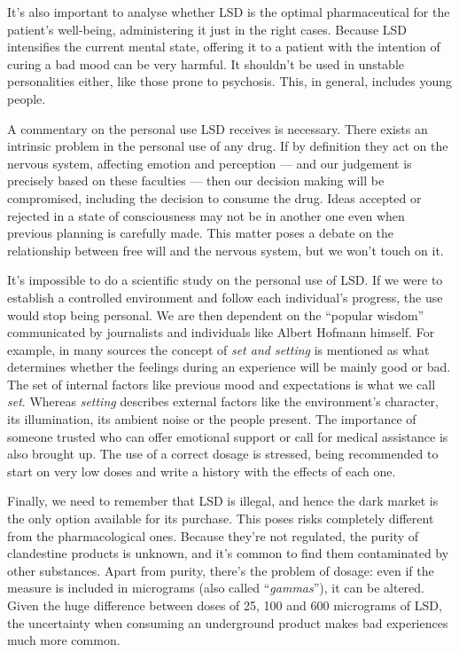 It's also important to analyse whether LSD is the optimal pharmaceutical for the patient's well-being, administering it just in the right cases. Because LSD intensifies the current mental state, offering it to a patient with the intention of curing a bad mood can be very harmful. It shouldn't be used in unstable personalities either, like those prone to psychosis. This, in general, includes young people.

A commentary on the personal use LSD receives is necessary. There exists an intrinsic problem in the personal use of any drug. If by definition they act on the nervous system, affecting emotion and perception --- and our judgement is precisely based on these faculties --- then our decision making will be compromised, including the decision to consume the drug. Ideas accepted or rejected in a state of consciousness may not be in another one even when previous planning is carefully made. This matter poses a debate on the relationship between free will and the nervous system, but we won't touch on it.

It's impossible to do a scientific study on the personal use of LSD. If we were to establish a controlled environment and follow each individual's progress, the use would stop being personal. We are then dependent on the \enquote{popular wisdom} communicated by journalists and individuals like Albert Hofmann himself. For example, in many sources the concept of \textit{set and setting} is mentioned as what determines whether the feelings during an experience will be mainly good or bad. The set of internal factors like previous mood and expectations is what we call \textit{set}. Whereas \textit{setting} describes external factors like the environment's character, its illumination, its ambient noise or the people present. The importance of someone trusted who can offer emotional support or call for medical assistance is also brought up. The use of a correct dosage is stressed, being recommended to start on very low doses and write a history with the effects of each one.

Finally, we need to remember that LSD is illegal, and hence the dark market is the only option available for its purchase. This poses risks completely different from the pharmacological ones. Because they're not regulated, the purity of clandestine products is unknown, and it's common to find them contaminated by other substances. Apart from purity, there's the problem of dosage: even if the measure is included in micrograms (also called \enquote{\textit{gammas}}), it can be altered. Given the huge difference between doses of 25, 100 and 600 micrograms of LSD, the uncertainty when consuming an underground product makes bad experiences much more common.

\newpage
